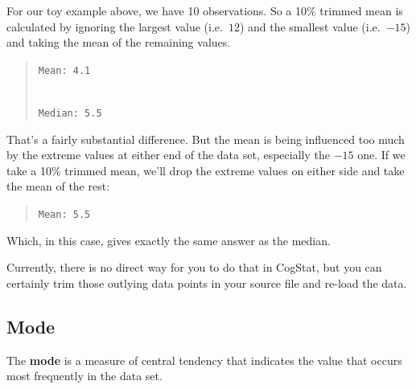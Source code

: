 \documentclass[
  11pt,
  a4paper,
  twoside,symmetric,openright]{book}
\theoremstyle{break}
\theoremstyle{break}
\begin{document}
\begin{example}
\protect\hypertarget{exm:extrimmedmean}{}\label{exm:extrimmedmean}For our toy example above, we have 10 observations. So a 10\% trimmed mean is calculated by ignoring the largest value (i.e.~\(12\)) and the smallest value (i.e.~\(-15\)) and taking the mean of the remaining values.

\begin{quote}
\texttt{Mean:\ 4.1}\strut \\
\texttt{Median:\ 5.5}
\end{quote}

That's a fairly substantial difference. But the mean is being influenced too much by the extreme values at either end of the data set, especially the \(-15\) one. If we take a 10\% trimmed mean, we'll drop the extreme values on either side and take the mean of the rest:

\begin{quote}
\texttt{Mean:\ 5.5}
\end{quote}

Which, in this case, gives exactly the same answer as the median.
\end{example}

Currently, there is no direct way for you to do that in CogStat, but you can certainly trim those outlying data points in your source file and re-load the data.

\subsection{Mode}\label{mode}

\begin{definition}[Mode]
\protect\hypertarget{def:defmode}{}\label{def:defmode}The \textbf{mode} is a measure of central tendency that indicates the value that occurs most frequently in the data set.
\end{definition}
\end{document}
